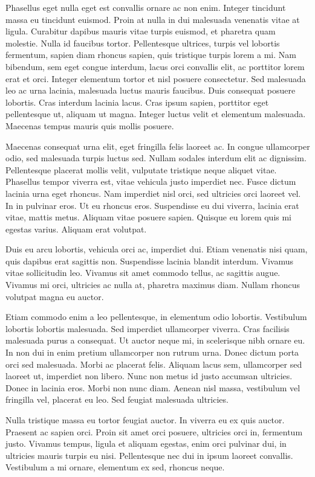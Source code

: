 Phasellus eget nulla eget est convallis ornare ac non enim. Integer tincidunt massa eu tincidunt euismod. Proin at nulla in dui malesuada venenatis vitae at ligula. Curabitur dapibus mauris vitae turpis euismod, et pharetra quam molestie. Nulla id faucibus tortor. Pellentesque ultrices, turpis vel lobortis fermentum, sapien diam rhoncus sapien, quis tristique turpis lorem a mi. Nam bibendum, sem eget congue interdum, lacus orci convallis elit, ac porttitor lorem erat et orci. Integer elementum tortor et nisl posuere consectetur. Sed malesuada leo ac urna lacinia, malesuada luctus mauris faucibus. Duis consequat posuere lobortis. Cras interdum lacinia lacus. Cras ipsum sapien, porttitor eget pellentesque ut, aliquam ut magna. Integer luctus velit et elementum malesuada. Maecenas tempus mauris quis mollis posuere.

Maecenas consequat urna elit, eget fringilla felis laoreet ac. In congue ullamcorper odio, sed malesuada turpis luctus sed. Nullam sodales interdum elit ac dignissim. Pellentesque placerat mollis velit, vulputate tristique neque aliquet vitae. Phasellus tempor viverra est, vitae vehicula justo imperdiet nec. Fusce dictum lacinia urna eget rhoncus. Nam imperdiet nisl orci, sed ultricies orci laoreet vel. In in pulvinar eros. Ut eu rhoncus eros. Suspendisse eu dui viverra, lacinia erat vitae, mattis metus. Aliquam vitae posuere sapien. Quisque eu lorem quis mi egestas varius. Aliquam erat volutpat.

Duis eu arcu lobortis, vehicula orci ac, imperdiet dui. Etiam venenatis nisi quam, quis dapibus erat sagittis non. Suspendisse lacinia blandit interdum. Vivamus vitae sollicitudin leo. Vivamus sit amet commodo tellus, ac sagittis augue. Vivamus mi orci, ultricies ac nulla at, pharetra maximus diam. Nullam rhoncus volutpat magna eu auctor.

Etiam commodo enim a leo pellentesque, in elementum odio lobortis. Vestibulum lobortis lobortis malesuada. Sed imperdiet ullamcorper viverra. Cras facilisis malesuada purus a consequat. Ut auctor neque mi, in scelerisque nibh ornare eu. In non dui in enim pretium ullamcorper non rutrum urna. Donec dictum porta orci sed malesuada. Morbi ac placerat felis. Aliquam lacus sem, ullamcorper sed laoreet ut, imperdiet non libero. Nunc non metus id justo accumsan ultricies. Donec in lacinia eros. Morbi non nunc diam. Aenean nisl massa, vestibulum vel fringilla vel, placerat eu leo. Sed feugiat malesuada ultricies.

Nulla tristique massa eu tortor feugiat auctor. In viverra eu ex quis auctor. Praesent ac sapien orci. Proin sit amet orci posuere, ultricies orci in, fermentum justo. Vivamus tempus, ligula et aliquam egestas, enim orci pulvinar dui, in ultricies mauris turpis eu nisi. Pellentesque nec dui in ipsum laoreet convallis. Vestibulum a mi ornare, elementum ex sed, rhoncus neque.

